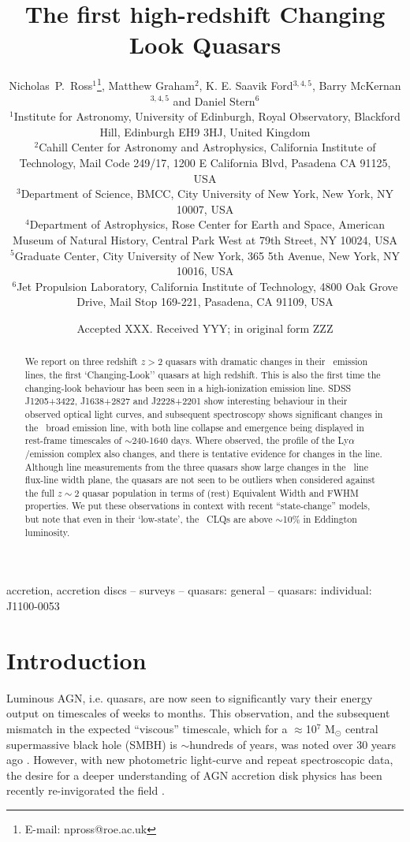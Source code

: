\documentclass[a4paper,fleqn,usenatbib]{mnras}
\title[High-redshift CLQs]{The first high-redshift Changing Look Quasars}
\author[Bercow]
{%
Nicholas~P.~Ross$^{1}$\thanks{E-mail: npross@roe.ac.uk},
 Matthew Graham$^{2}$, K. E. Saavik Ford$^{3,4,5}$,  Barry McKernan$^{3,4,5}$   
\newauthor and Daniel Stern$^{6}$ 
\\
$^{1}$Institute for Astronomy, University of Edinburgh, Royal Observatory, Blackford Hill, Edinburgh EH9 3HJ, United Kingdom \\
$^{2}$Cahill Center for Astronomy and Astrophysics, California Institute of Technology, Mail Code 249/17, 1200 E California Blvd, Pasadena CA 91125, USA\\
$^{3}$Department of Science, BMCC, City University of New York, New York, NY 10007, USA \\
$^{4}$Department of Astrophysics, Rose Center for Earth and Space, American Museum of Natural History, Central Park West at 79th Street, NY 10024, USA \\
$^{5}$Graduate Center, City University of New York, 365 5th Avenue, New York, NY 10016, USA\\
$^{6}$Jet Propulsion Laboratory, California Institute of Technology, 4800 Oak Grove Drive, Mail Stop 169-221, Pasadena, CA 91109, USA \\
}
\date{Accepted XXX. Received YYY; in original form ZZZ}
\begin{document}
\label{firstpage}
\pagerange{\pageref{firstpage}--\pageref{lastpage}}
\maketitle

\begin{abstract}
We report on three redshift $z>2$ quasars with dramatic changes in
their \civ\ emission lines, the first `Changing-Look'' quasars at high
redshift.  This is also the first time the changing-look behaviour has
been seen in a high-ionization emission line.
SDSS J1205+3422, J1638+2827 and J2228+2201 show interesting behaviour
in their observed optical light curves, and subsequent spectroscopy
shows significant changes in the \civ\ broad emission line, with both
line collapse and emergence being displayed in rest-frame timescales
of $\sim$240-1640 days.
Where observed, the profile of the Ly$\alpha$/\nv emission complex
also changes, and there is tentative evidence for changes in the \mgii
line.
Although line measurements from the three quasars show large changes
in the \civ\ line flux-line width plane, the quasars are not seen to
be outliers when considered against the full $z\sim2$ quasar population
in terms of (rest) Equivalent Width and FWHM properties.
We put these observations in context with recent ``state-change''
models, but note that even in their `low-state', the \civ\ CLQs are
above $\sim$10\% in Eddington luminosity.
\end{abstract}



\begin{keywords}
accretion, accretion discs -- surveys -- quasars: general -- quasars: individual: J1100-0053 
\end{keywords}



\section{Introduction}
Luminous AGN, i.e. quasars, are now seen to significantly vary their
energy output on timescales of weeks to months.  This observation, and
the subsequent mismatch in the expected ``viscous'' timescale, which
for a $\approx$10$^{7}$ M$_{\odot}$ central supermassive black hole
(SMBH) is $\sim$hundreds of years, was noted over 30 years ago
\citep[e.g.][]{Alloin1985}. However, with new photometric light-curve
and repeat spectroscopic data, the desire for a deeper understanding
of AGN accretion disk physics has been recently re-invigorated the
field \citep[e.g.][]{Lawrence2018, Antonucci2018}.
\end{document}
